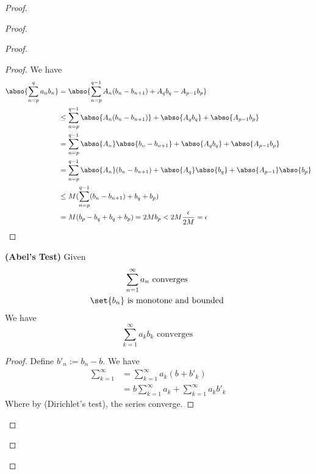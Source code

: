 \documentclass{report}
\begin{document}
\begin{proof}
\begin{proof}
\begin{proof}
\begin{proof}
We have
\begin{align*}
\abso{\sum_{n=p}^q a_nb_n}&=\abso{\sum_{n=p}^{q-1}A_n(b_n-b_{n+1})+A_qb_q-A_{p-1}b_p}\\
&\leq \sum_{n=p}^{q-1}\abso{A_n(b_n-b_{n+1})}+\abso{A_qb_q}+\abso{A_{p-1}b_p}\\
&=\sum_{n=p}^{q-1} \abso{A_n}\abso{b_n-b_{n+1}}+\abso{A_qb_q}+\abso{A_{p-1}b_p}\\
&=\sum_{n=p}^{q-1}\abso{A_n}(b_n-b_{n+1})+\abso{A_q}\abso{b_q}+\abso{A_{p-1}}\abso{b_p}\\
&\leq M(\sum_{n=p}^{q-1}(b_n-b_{n+1})+b_q+b_p)\\
&=M(b_p-b_q+b_q+b_p)=2Mb_p<2M \frac{\epsilon }{2M}=\epsilon 
\end{align*}
\end{proof}
\begin{theorem}
\label{4.6.6}
\textbf{(Abel's Test)}
Given 
\begin{gather*}
\sum_{n=1}^\infty a_n\text{ converges }\\
\set{b_n}\text{ is monotone and bounded }
\end{gather*}
We have
\begin{equation*}
\sum_{k=1}^\infty a_kb_k\text{ converges }
\end{equation*}
\end{theorem}
\begin{proof}
Define $b'_n:=b_n-b$. We have
 \begin{align*}
\sum_{k=1}^\infty &=\sum_{k=1}^\infty a_k(b+b'_k)\\
&=b\sum_{k=1}^\infty a_k+\sum_{k=1}^\infty a_kb'_k
\end{align*}
Where by   (Dirichlet's test), the series converge.
\end{proof}

\end{proof}
\end{proof}
\end{proof}
\end{document}
